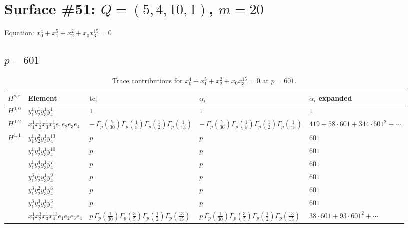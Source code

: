 \documentclass[11pt]{article}
\begin{document}
\newpage

\section*{Surface \#51: $Q=(5, 4, 10, 1)$, $m=20$}

Equation: $x_0^{4} + x_1^{5} + x_2^{2} + x_0 x_3^{15} = 0$

\subsection*{$p = 601$}

\begin{table}[ht]
\centering
\caption{Trace contributions for $x_0^{4} + x_1^{5} + x_2^{2} + x_0 x_3^{15} = 0$ at $p=601$.}\label{tab:deformed-51}
\renewcommand{\arraystretch}{1.1}
{\scriptsize
\begin{tabular}{@{}lllll@{}}
\toprule
$H^{s,r}$ & Element & $\mathrm{tc}_i$ & $\alpha_i$ & $\alpha_i$ expanded \\
\midrule
$H^{0,0}$ & $y_{1}^{1} y_{2}^{1} y_{3}^{1} y_{4}^{1}$ & $1$ & $1$ & $1$ \\
\midrule
$H^{0,2}$ & $x_{1}^{1} x_{2}^{1} x_{3}^{1} x_{4}^{1}  e_{1} e_{2} e_{3} e_{4}$ & $- \, \Gamma_p \left( \frac{7}{30} \right) \Gamma_p \left( \frac{1}{5} \right) \Gamma_p \left( \frac{1}{2} \right) \Gamma_p \left( \frac{1}{15} \right)$ & $- \, \Gamma_p \left( \frac{7}{30} \right) \Gamma_p \left( \frac{1}{5} \right) \Gamma_p \left( \frac{1}{2} \right) \Gamma_p \left( \frac{1}{15} \right)$ & $419{+}58{\cdot}601{+}344{\cdot}601^{2}{+}\cdots$ \\
\midrule
$H^{1,1}$ & $y_{1}^{1} y_{2}^{2} y_{3}^{1} y_{4}^{13}$ & $p \,$ & $p \,$ & $601$ \\
 & $y_{1}^{1} y_{2}^{3} y_{3}^{1} y_{4}^{10}$ & $p \,$ & $p \,$ & $601$ \\
 & $y_{1}^{1} y_{2}^{4} y_{3}^{1} y_{4}^{7}$ & $p \,$ & $p \,$ & $601$ \\
 & $y_{1}^{3} y_{2}^{1} y_{3}^{1} y_{4}^{9}$ & $p \,$ & $p \,$ & $601$ \\
 & $y_{1}^{3} y_{2}^{2} y_{3}^{1} y_{4}^{6}$ & $p \,$ & $p \,$ & $601$ \\
 & $y_{1}^{3} y_{2}^{3} y_{3}^{1} y_{4}^{3}$ & $p \,$ & $p \,$ & $601$ \\
 & $x_{1}^{1} x_{2}^{3} x_{3}^{1} x_{4}^{13}  e_{1} e_{2} e_{3} e_{4}$ & $p \, \Gamma_p \left( \frac{1}{30} \right) \Gamma_p \left( \frac{3}{5} \right) \Gamma_p \left( \frac{1}{2} \right) \Gamma_p \left( \frac{13}{15} \right)$ & $p \, \Gamma_p \left( \frac{1}{30} \right) \Gamma_p \left( \frac{3}{5} \right) \Gamma_p \left( \frac{1}{2} \right) \Gamma_p \left( \frac{13}{15} \right)$ & $38{\cdot}601{+}93{\cdot}601^{2}{+}\cdots$ \\

\end{tabular}}
\end{table}
\end{document}
